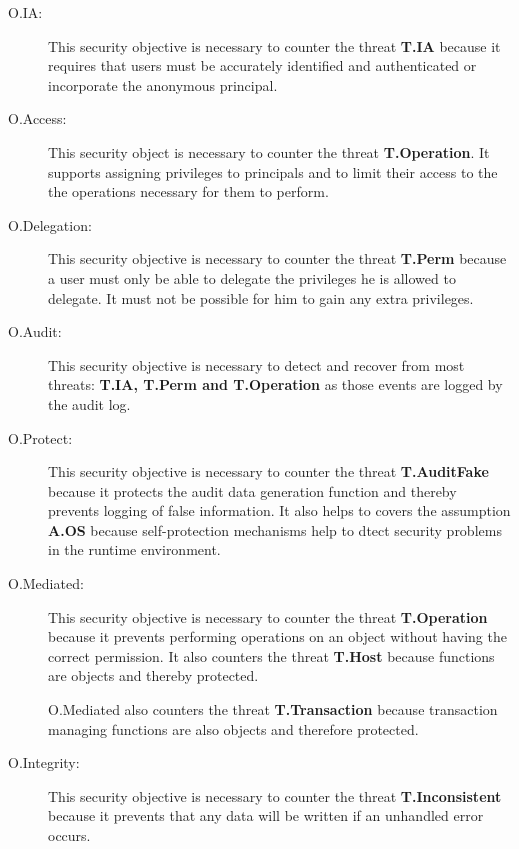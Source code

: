 \documentclass[12pt,english]{scrbook}
\begin{document}
\begin{description}
  
  \item[O.IA:] This security objective is necessary to counter the threat
  \textbf{T.IA} because it requires that users must be accurately identified
  and authenticated or incorporate the anonymous principal.

  \item[O.Access:] This security object is necessary to counter the threat
      \textbf{T.Operation}.  It supports assigning privileges to principals and
      to limit their access to the the operations necessary for them to
      perform.

  \item[O.Delegation:] This security objective is necessary to counter the
  threat \textbf{T.Perm} because a user must only be able to delegate the privileges
  he is allowed to delegate. It must not be possible for him to gain any extra
  privileges.

  \item[O.Audit:] This security objective is necessary to detect and recover
    from most threats: \textbf{T.IA, T.Perm and T.Operation} as those events
    are logged by the audit log.
  
  \item[O.Protect:] This security objective is necessary to counter the threat
  \textbf{T.AuditFake} because it protects the audit data generation function
  and thereby prevents logging of false information. It also helps to covers
  the assumption \textbf{A.OS} because self-protection mechanisms help to
  dtect security problems in the runtime environment.
  
  \item[O.Mediated:] This security objective is necessary to counter the threat
  \textbf{T.Operation} because it prevents performing operations on an object
  without having the correct permission. It also counters the threat
  \textbf{T.Host} because functions are objects and thereby protected.

  O.Mediated also counters the threat \textbf{T.Transaction} because transaction
  managing functions are also objects and therefore protected.

  \item[O.Integrity:] This security objective is necessary to counter the
    threat \textbf{T.Inconsistent} because it prevents that any data will be
    written if an unhandled error occurs.
  

\end{description}
\end{document}
